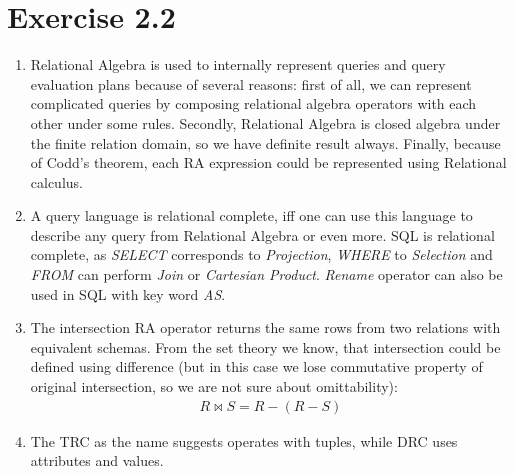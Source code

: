 \documentclass[10pt]{article}
\begin{document}
  \section*{Exercise 2.2}
  \begin{enumerate}[label=\arabic*.]
    \item
		Relational Algebra is used to internally represent queries and query evaluation
    plans because of several reasons: first of all, we can represent complicated queries
    by composing relational algebra operators with each other under some rules. Secondly,
    Relational Algebra is closed algebra under the finite relation domain, so we have
    definite result always. Finally, because of Codd's theorem, each RA expression
    could be represented using Relational calculus.
    \item
		A query language is relational complete, iff one can use this language to describe
    any query from Relational Algebra or even more. SQL is relational complete, as
    \textit{SELECT} corresponds to \textit{Projection}, \textit{WHERE} to \textit{Selection}
    and \textit{FROM} can perform \textit{Join} or \textit{Cartesian Product}. \textit{Rename}
    operator can also be used in SQL with key word \textit{AS}.
    \item
    The intersection RA operator returns the same rows from two relations with equivalent
    schemas. From the set theory we know, that intersection could be defined using
    difference (but in this case we lose commutative property of original intersection,
    so we are not sure about omittability):
    \begin{align}
      R \bowtie S = R - (R - S)
    \end{align}
    \item
  		The TRC as the name suggests operates with tuples, while DRC uses attributes and values.
  \end{enumerate}
\end{document}
